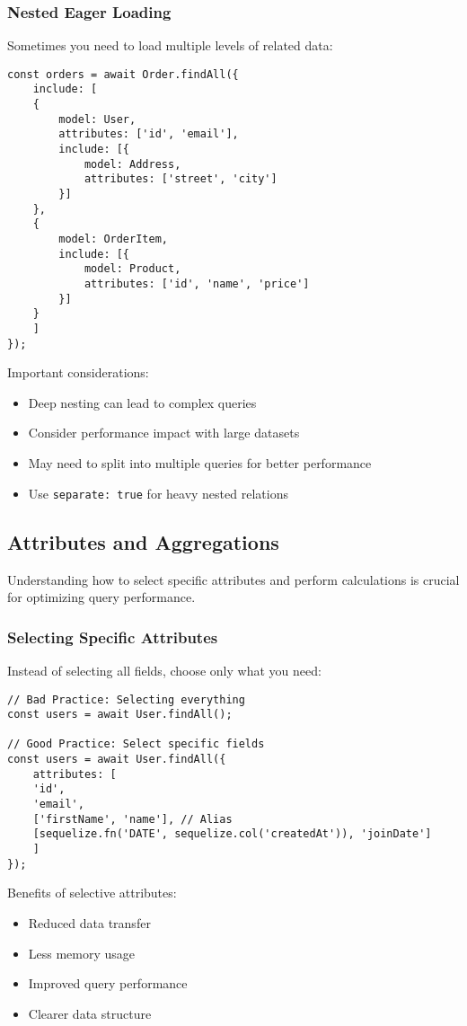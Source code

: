 \documentclass[12pt,a4paper]{book}
\begin{document}
	
	\subsubsection{Nested Eager Loading}
	Sometimes you need to load multiple levels of related data:
	
	
		\begin{verbatim}
const orders = await Order.findAll({
	include: [
	{
		model: User,
		attributes: ['id', 'email'],
		include: [{
			model: Address,
			attributes: ['street', 'city']
		}]
	},
	{
		model: OrderItem,
		include: [{
			model: Product,
			attributes: ['id', 'name', 'price']
		}]
	}
	]
});
		\end{verbatim}
		
		Important considerations:
		\begin{itemize}
			\item Deep nesting can lead to complex queries
			\item Consider performance impact with large datasets
			\item May need to split into multiple queries for better performance
			\item Use \texttt{separate: true} for heavy nested relations
		\end{itemize}
	
	
	\subsection{Attributes and Aggregations}
	Understanding how to select specific attributes and perform calculations is crucial for optimizing query performance.
	
	\subsubsection{Selecting Specific Attributes}
	\begin{tcolorbox}[title=Optimizing Field Selection]
		Instead of selecting all fields, choose only what you need:
		
		\begin{verbatim}
// Bad Practice: Selecting everything
const users = await User.findAll();

// Good Practice: Select specific fields
const users = await User.findAll({
	attributes: [
	'id', 
	'email',
	['firstName', 'name'], // Alias
	[sequelize.fn('DATE', sequelize.col('createdAt')), 'joinDate']
	]
});
		\end{verbatim}
		
		Benefits of selective attributes:
		\begin{itemize}
			\item Reduced data transfer
			\item Less memory usage
			\item Improved query performance
			\item Clearer data structure
		\end{itemize}
	\end{tcolorbox}
	
\end{document}
